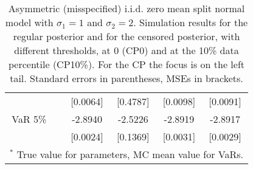 {\begin{table}
\begin{tabular}{cc cccc}
  && [0.0064] & [0.4787] & [0.0098] & [0.0091]  \\ 
VaR 5\% && -2.8940 & -2.5226 & -2.8919 & -2.8917  \\ 
 && [0.0024] & [0.1369] & [0.0031] & [0.0029]  \\ 
\hline 
\multicolumn{6}{l}{\footnotesize{$^*$ True value for parameters, MC mean value for VaRs.}}  \\ 
\end{tabular}
 \caption{Asymmetric (misspecified) i.i.d. zero mean split normal model with $\sigma_{1} = 1$ and $\sigma_{2} = 2$. Simulation results for the regular posterior and for the censored posterior,  with different thresholds, at $0$ (CP0) and at the 10\% data percentile (CP10\%). For the CP the focus is on the left tail. Standard errors in parentheses, MSEs in brackets.} 
\label{tab:iid}  
\end{table}
}